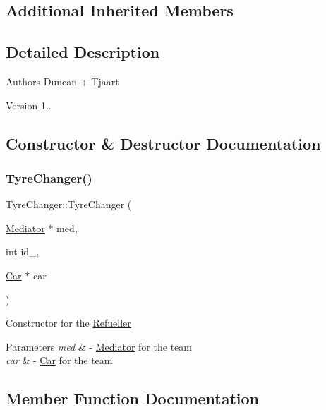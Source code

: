 \subsection*{Additional Inherited Members}


\subsection{Detailed Description}
\begin{DoxyAuthor}{Authors}
Duncan + Tjaart 
\end{DoxyAuthor}
\begin{DoxyVersion}{Version}
1.. 
\end{DoxyVersion}


\subsection{Constructor \& Destructor Documentation}
\mbox{\label{class_tyre_changer_ad1c0e1f17ef376d29b48b3a1849a4f9b}} 
\subsubsection{\texorpdfstring{Tyre\+Changer()}{TyreChanger()}}
{\footnotesize\ttfamily Tyre\+Changer\+::\+Tyre\+Changer (\begin{DoxyParamCaption}\item[{\mbox{\hyperlink{class_mediator}{Mediator}} $\ast$}]{med,  }\item[{int}]{id\+\_\+,  }\item[{\mbox{\hyperlink{class_car}{Car}} $\ast$}]{car }\end{DoxyParamCaption})\hspace{0.3cm}{\ttfamily [inline]}}

Constructor for the \mbox{\hyperlink{class_refueller}{Refueller}} 
\begin{DoxyParams}{Parameters}
{\em med} & -\/ \mbox{\hyperlink{class_mediator}{Mediator}} for the team \\
\hline
{\em car} & -\/ \mbox{\hyperlink{class_car}{Car}} for the team \\
\hline
\end{DoxyParams}


\subsection{Member Function Documentation}
\mbox{\label{class_tyre_changer_aaa9c2d0249f50dd8da54e4af8e85835b}} 
